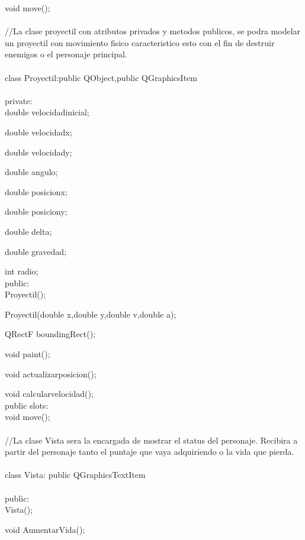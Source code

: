 \documentclass{article}
\begin{document}
    void move();\\
\rbrace\\

//La clase proyectil con atributos privados y metodos publicos, se podra modelar un proyectil con movimiento fisico caracteristico esto con el fin de destruir enemigos o el personaje principal.\\
\\
class Proyectil:public QObject,public QGraphicsItem\\
\lbrace\\
private:\\

    double velocidadinicial;
    
    double velocidadx;
    
    double velocidady;
    
    double angulo;
    
    double posicionx;
    
    double posiciony;

    double delta;
    
    double gravedad;

    int radio;\\
public:\\

    Proyectil();
    
    Proyectil(double x,double y,double v,double a);

    QRectF boundingRect();
    
    void paint();

    void actualizarposicion();
    
    void calcularvelocidad();\\
public slots:\\

    void move();\\
\rbrace\\

//La clase Vista sera la encargada de mostrar el status del personaje. Recibira a partir del personaje tanto el puntaje que vaya adquiriendo o la vida que pierda.\\
\\
class Vista: public QGraphicsTextItem\\
\lbrace\\
public:\\

    Vista();
    
    void AumentarVida();
    
\end{document}

